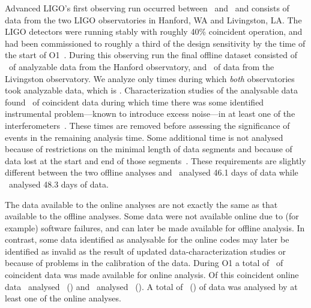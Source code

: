 Advanced \ac{LIGO}'s first observing run occurred between \OoneSTART\ and \OoneEND\
and consists of data from the two \ac{LIGO} observatories in Hanford, WA and Livingston, LA.
The LIGO detectors were running stably with roughly 40\% coincident operation, and had
been commissioned to roughly a third of the design sensitivity by the time of the start of O1~\citep{Martynov:2016fzi}.
During this observing run the final offline dataset consisted of \OoneOfflineAnalysableHTimeSeconds\
of analyzable data from the Hanford observatory, and \OoneOfflineAnalysableLTimeSeconds\ of data from the
Livingston observatory. We analyze only times during which \emph{both} observatories
took analyzable data, which is \OoneOfflineAnalysableTimeSeconds. Characterization studies of the analysable
data found \OoneOfflineAnalysableCatTwoDiffSeconds\ of coincident data during which time
there was some identified instrumental problem---known to
introduce excess noise---in at least one of the interferometers~\citep{TheLIGOScientific:2016zmo}.
These times are removed before assessing the significance of events
in the remaining analysis time. Some additional time is not analysed because
of restrictions on the minimal length of data segments and because of data lost
at the start and end of those segments~\citep{TheLIGOScientific:2016qqj, TheLIGOScientific:2016pea}.
These requirements are slightly different between the two offline analyses and \pycbc\
analysed 46.1 days of data while \gstlal\ analysed 48.3 days of data.

The data available to the online analyses are not exactly the same as that
available to the offline analyses. Some data were not available online due to (for
example) software
failures, and can later be made available for offline analysis. In contrast,
some data identified as analysable for the online codes may later be identified as invalid as the result
of updated data-characterization studies or because of problems in the calibration of the data.
During \ac{O1} a total of \OoneOnlineAnalysableTimeSeconds\
of coincident data was made available for online analysis.
Of this coincident online data \mbta\ analysed
\OoneOnlineAnalysedMBTATimeSeconds\ (\OoneOnlineAnalysedMBTATimePercent) and
\gstlal\ analysed
\OoneOnlineAnalysedGSTLALTimeSeconds\ (\OoneOnlineAnalysedGSTLALTimePercent).
A total of \OoneOnlineAnalysedBOTHTimeSeconds\ (\OoneOnlineAnalysedBOTHTimePercent)
of data was analysed by at least one of the online analyses.
